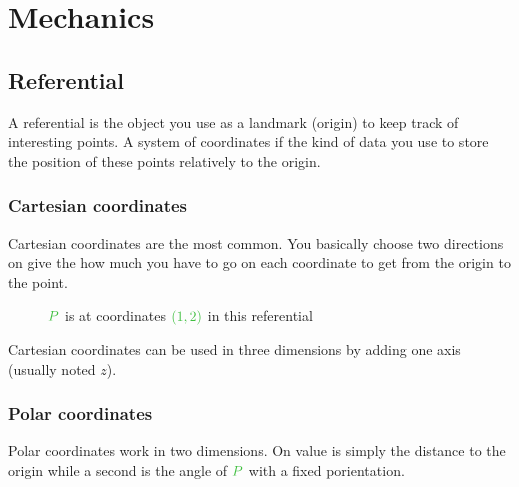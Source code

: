 \chapter{Mechanics}
\banner
{}



\section{Referential}

A referential is the object you use as a landmark (origin) to keep track
of interesting points. A system of coordinates if the kind of data you
use to store the position of these points relatively to the origin.


\subsection{Cartesian coordinates}

Cartesian coordinates are the most common. You basically choose two
directions on give the how much you have to go on each coordinate to
get from the origin to the point.

\begin{figure}[H]
\centering
{}
\caption{$\posit{P}$ is at coordinates $\posit{(1,2)}$ in this referential}
\end{figure}

Cartesian coordinates can be used in three dimensions by adding one axis
(usually noted $z$).


\subsection{Polar coordinates}

Polar coordinates work in two dimensions. On value is simply the distance
to the origin while a second is the angle of $\posit{P}$ with a fixed
porientation.

